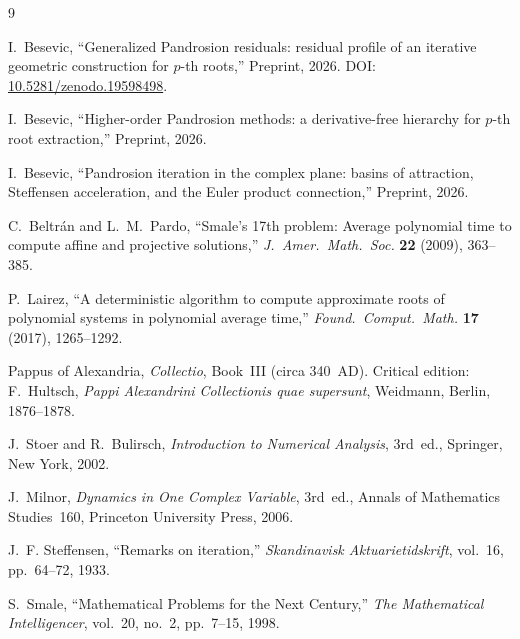 \documentclass[10pt,a4paper,oneside]{book}
\theoremstyle{definition}
\theoremstyle{remark}
\begin{document}
\begin{thebibliography}{9}

I.~Besevic,
``Generalized Pandrosion residuals: residual profile of an iterative geometric construction for $p$-th roots,''
Preprint, 2026.
DOI: \href{https://doi.org/10.5281/zenodo.19598498}{10.5281/zenodo.19598498}.

I.~Besevic,
``Higher-order Pandrosion methods: a derivative-free hierarchy for $p$-th root extraction,''
Preprint, 2026.

I.~Besevic,
``Pandrosion iteration in the complex plane: basins of attraction, Steffensen acceleration, and the Euler product connection,''
Preprint, 2026.

C.~Beltr\'{a}n and L.~M.~Pardo,
``Smale's 17th problem: Average polynomial time to compute affine and projective solutions,''
\textit{J.\ Amer.\ Math.\ Soc.} \textbf{22} (2009), 363--385.

P.~Lairez,
``A deterministic algorithm to compute approximate roots of polynomial systems in polynomial average time,''
\textit{Found.\ Comput.\ Math.} \textbf{17} (2017), 1265--1292.

Pappus of Alexandria,
\textit{Collectio}, Book~III (circa 340~AD).
Critical edition: F.~Hultsch, \textit{Pappi Alexandrini Collectionis quae supersunt},
Weidmann, Berlin, 1876--1878.

J.~Stoer and R.~Bulirsch,
\textit{Introduction to Numerical Analysis},
3rd~ed., Springer, New York, 2002.

J.~Milnor,
\textit{Dynamics in One Complex Variable},
3rd~ed., Annals of Mathematics Studies~160, Princeton University Press, 2006.

J.~F. Steffensen,
``Remarks on iteration,''
\textit{Skandinavisk Aktuarietidskrift}, vol.~16, pp.~64--72, 1933.

S.~Smale,
``Mathematical Problems for the Next Century,''
\textit{The Mathematical Intelligencer}, vol.~20, no.~2, pp.~7--15, 1998.

\end{thebibliography}





\end{document}
